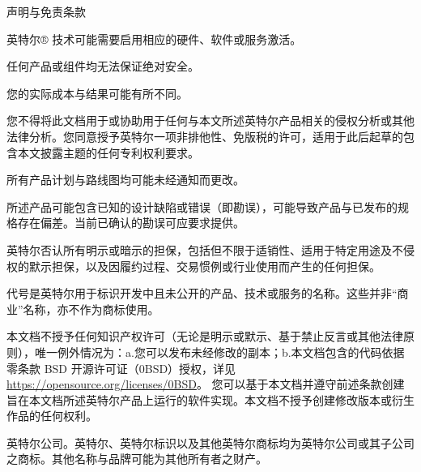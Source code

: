 \documentclass{article}
\begin{document}
声明与免责条款

英特尔® 技术可能需要启用相应的硬件、软件或服务激活。

任何产品或组件均无法保证绝对安全。

您的实际成本与结果可能有所不同。

您不得将此文档用于或协助用于任何与本文所述英特尔产品相关的侵权分析或其他法律分析。您同意授予英特尔一项非排他性、免版税的许可，适用于此后起草的包含本文披露主题的任何专利权利要求。

所有产品计划与路线图均可能未经通知而更改。

所述产品可能包含已知的设计缺陷或错误（即勘误），可能导致产品与已发布的规格存在偏差。当前已确认的勘误可应要求提供。

英特尔否认所有明示或暗示的担保，包括但不限于适销性、适用于特定用途及不侵权的默示担保，以及因履约过程、交易惯例或行业使用而产生的任何担保。

代号是英特尔用于标识开发中且未公开的产品、技术或服务的名称。这些并非“商业”名称，亦不作为商标使用。

本文档不授予任何知识产权许可（无论是明示或默示、基于禁止反言或其他法律原则），唯一例外情况为：a.您可以发布未经修改的副本；b.本文档包含的代码依据零条款 BSD 开源许可证（0BSD）授权，详见 \url{https://opensource.org/licenses/0BSD}。
您可以基于本文档并遵守前述条款创建旨在本文档所述英特尔产品上运行的软件实现。本文档不授予创建修改版本或衍生作品的任何权利。

\textcopyright 英特尔公司。英特尔、英特尔标识以及其他英特尔商标均为英特尔公司或其子公司之商标。其他名称与品牌可能为其他所有者之财产。
\end{document}

